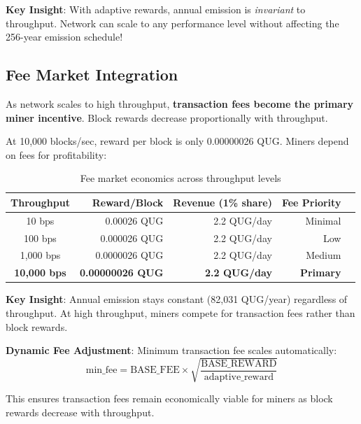 \documentclass[11pt,a4paper]{article}
\begin{document}
\textbf{Key Insight}: With adaptive rewards, annual emission is \textit{invariant} to throughput. Network can scale to any performance level without affecting the 256-year emission schedule!

\subsection{Fee Market Integration}

\begin{tcolorbox}[colback=accentcolor!10, colframe=accentcolor, title=Critical Economic Shift at High Throughput]
As network scales to high throughput, \textbf{transaction fees become the primary miner incentive}. Block rewards decrease proportionally with throughput.
\end{tcolorbox}

At 10,000 blocks/sec, reward per block is only 0.00000026 QUG. Miners depend on fees for profitability:

\begin{table}[h]
\centering
\small
\begin{tabular}{crrrr}
\toprule
\textbf{Throughput} & \textbf{Reward/Block} & \textbf{Revenue (1\% share)} & \textbf{Fee Priority} \\
\midrule
10 bps & 0.00026 QUG & 2.2 QUG/day & Minimal \\
100 bps & 0.000026 QUG & 2.2 QUG/day & Low \\
1,000 bps & 0.0000026 QUG & 2.2 QUG/day & Medium \\
\textbf{10,000 bps} & \textbf{0.00000026 QUG} & \textbf{2.2 QUG/day} & \textbf{Primary} \\
\bottomrule
\end{tabular}
\caption{Fee market economics across throughput levels}
\end{table}

\textbf{Key Insight}: Annual emission stays constant (82,031 QUG/year) regardless of throughput. At high throughput, miners compete for transaction fees rather than block rewards.

\textbf{Dynamic Fee Adjustment}: Minimum transaction fee scales automatically:
\begin{equation}
\text{min\_fee} = \text{BASE\_FEE} \times \sqrt{\frac{\text{BASE\_REWARD}}{\text{adaptive\_reward}}}
\end{equation}

This ensures transaction fees remain economically viable for miners as block rewards decrease with throughput.
\end{document}
